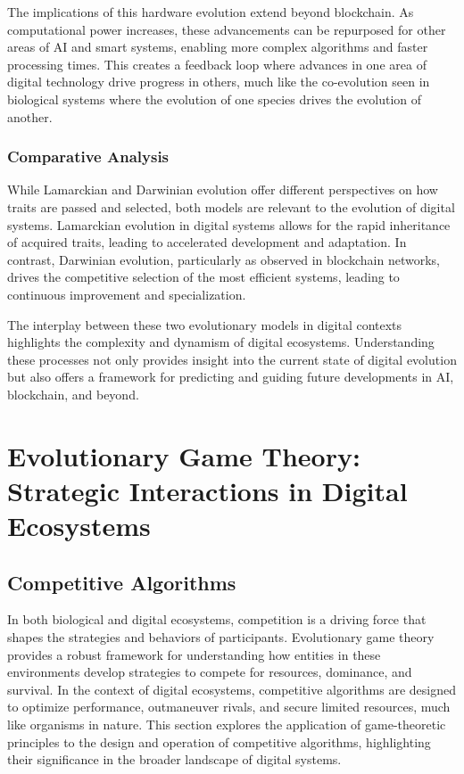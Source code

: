 \documentclass[12pt,twoside]{article}
\begin{document}
The implications of this hardware evolution extend beyond blockchain. As computational power increases, these advancements can be repurposed for other areas of AI and smart systems, enabling more complex algorithms and faster processing times. This creates a feedback loop where advances in one area of digital technology drive progress in others, much like the co-evolution seen in biological systems where the evolution of one species drives the evolution of another.

\subsubsection{Comparative Analysis}

While Lamarckian and Darwinian evolution offer different perspectives on how traits are passed and selected, both models are relevant to the evolution of digital systems. Lamarckian evolution in digital systems allows for the rapid inheritance of acquired traits, leading to accelerated development and adaptation. In contrast, Darwinian evolution, particularly as observed in blockchain networks, drives the competitive selection of the most efficient systems, leading to continuous improvement and specialization.

The interplay between these two evolutionary models in digital contexts highlights the complexity and dynamism of digital ecosystems. Understanding these processes not only provides insight into the current state of digital evolution but also offers a framework for predicting and guiding future developments in AI, blockchain, and beyond.

\section{Evolutionary Game Theory: Strategic Interactions in Digital Ecosystems}

\subsection{Competitive Algorithms}

In both biological and digital ecosystems, competition is a driving force that shapes the strategies and behaviors of participants. Evolutionary game theory provides a robust framework for understanding how entities in these environments develop strategies to compete for resources, dominance, and survival. In the context of digital ecosystems, competitive algorithms are designed to optimize performance, outmaneuver rivals, and secure limited resources, much like organisms in nature. This section explores the application of game-theoretic principles to the design and operation of competitive algorithms, highlighting their significance in the broader landscape of digital systems.
\end{document}
